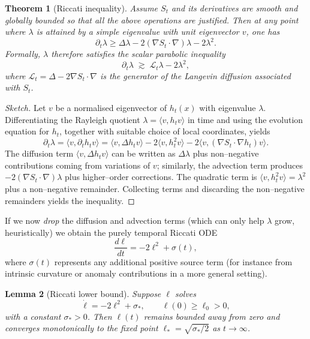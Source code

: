 \documentclass[11pt]{article}
\newtheorem{theorem}{Theorem}[section]
\newtheorem{lemma}[theorem]{Lemma}
\begin{document}
\begin{theorem}[Riccati inequality]
Assume $S_t$ and its derivatives are smooth and globally bounded so that
all the above operations are justified. Then at any point where $\lambda$
is attained by a simple eigenvalue with unit eigenvector $v$, one has
\begin{equation}
  \partial_t\lambda \ge \Delta\lambda - 2(\nabla S_t\cdot\nabla)\lambda
    - 2\lambda^2.
\end{equation}
Formally, $\lambda$ therefore satisfies the scalar parabolic inequality
\begin{equation}
  \partial_t\lambda \;\gtrsim\; \mathcal{L}_t\lambda - 2\lambda^2,
\end{equation}
where $\mathcal{L}_t = \Delta - 2\nabla S_t\cdot\nabla$ is the generator
of the Langevin diffusion associated with $S_t$.
\end{theorem}

\begin{proof}[Sketch]
Let $v$ be a normalised eigenvector of $h_t(x)$ with eigenvalue
$\lambda$. Differentiating the Rayleigh quotient
$\lambda = \langle v,h_tv\rangle$ in time and using the evolution
equation for $h_t$, together with suitable choice of local coordinates,
yields
\begin{equation}
  \partial_t\lambda
  = \langle v,\partial_t h_t v\rangle
  = \langle v,\Delta h_t v\rangle - 2\langle v,h_t^2 v\rangle
    - 2\langle v,(\nabla S_t\cdot\nabla h_t)v\rangle.
\end{equation}
The diffusion term $\langle v,\Delta h_t v\rangle$ can be written as
$\Delta\lambda$ plus non--negative contributions coming from variations
of $v$; similarly, the advection term produces $-2(\nabla S_t\cdot\nabla)
\lambda$ plus higher--order corrections. The quadratic term is
$\langle v,h_t^2 v\rangle = \lambda^2$ plus a non--negative remainder.
Collecting terms and discarding the non--negative remainders yields the
inequality.
\end{proof}

If we now \emph{drop} the diffusion and advection terms (which can only
help $\lambda$ grow, heuristically) we obtain the purely temporal
Riccati ODE
\begin{equation}
  \frac{d\ell}{dt} = -2\ell^2 + \sigma(t),
\end{equation}
where $\sigma(t)$ represents any additional positive source term (for
instance from intrinsic curvature or anomaly contributions in a more
general setting).

\begin{lemma}[Riccati lower bound]
Suppose $\ell$ solves
\begin{equation}
  \dot\ell = -2\ell^2 + \sigma_*,\qquad \ell(0)\ge \ell_0>0,
\end{equation}
with a constant $\sigma_*>0$. Then $\ell(t)$ remains bounded away from
zero and converges monotonically to the fixed point
$\ell_* = \sqrt{\sigma_*/2}$ as $t\to\infty$.
\end{lemma}
\end{document}
